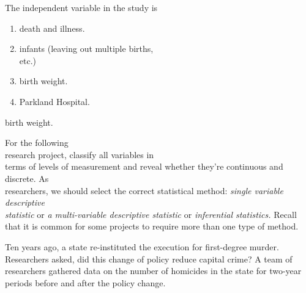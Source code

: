\documentclass[11pt]{book}\usepackage[]{graphicx}\usepackage[]{color}
\begin{document}
\begin{exercises}
\begin{exercise}
    The independent variable in the study is
    \begin{enumerate}
    \samepage
    \item death and illness.
    \samepage
    \item infants (leaving out multiple births, \\ etc.)
    \samepage
    \item birth weight.
    \samepage
    \item Parkland Hospital.
    \end{enumerate}
    \samepage
    \vspace{3mm}

  \end{exercise}
  \vspace{2mm}
  \begin{solution}
    birth weight.
  \end{solution}

\begin{exercise}  %

  For the following \\ research project, classify all variables in \\ terms of levels of measurement and reveal whether  they're continuous and discrete.  As \\ researchers, we should select the correct statistical method: {\emph{single variable descriptive}}  \\ {\emph{statistic}} or {\emph{a multi-variable descriptive  statistic}} or  {\emph{inferential statistics.}}  Recall that it is common for some projects to require more than one type of method.

	  Ten years ago, a state re-instituted the execution for first-degree murder.  Researchers asked, did this change of policy reduce capital crime?  A team of researchers gathered data on the number of homicides in the state for two-year periods before and after the policy change.

    \vspace{3mm}

  \end{exercise}
  \vspace{2mm}
%
%
%
\begin{exercise}   %


\end{exercise}
\end{exercises}
\end{document}
